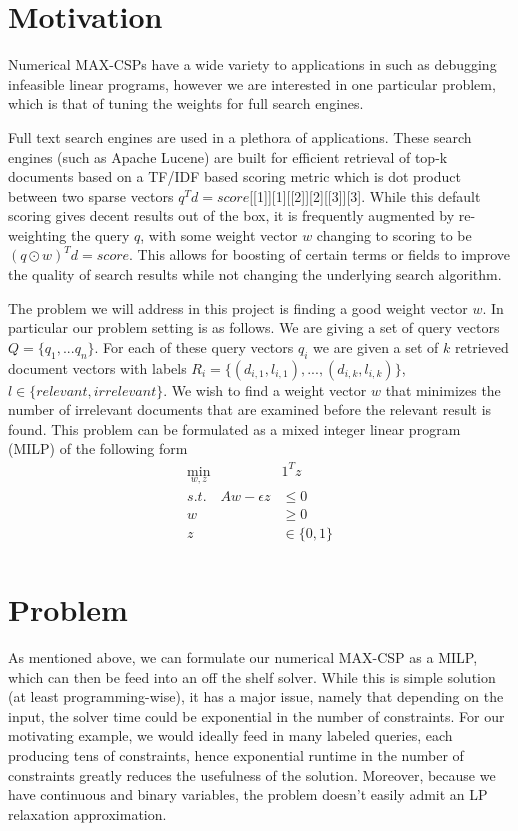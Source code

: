 \documentclass[a4paper]{article}
\begin{document}
\section{Motivation}

Numerical MAX-CSPs have a wide variety to applications in such as debugging infeasible 
linear programs, however we are interested in one particular problem, which is that of 
tuning the weights for full search engines. 

Full text search engines are used in a plethora of applications. These search engines (such as Apache Lucene)
are built for efficient retrieval of top-k documents based on a TF/IDF based scoring metric which is dot 
product between two sparse vectors $q^Td = score$[[1]][1][[2]][2][[3]][3]. While this default scoring gives decent results out of the box, 
it is frequently augmented by re-weighting the query $q$, with some weight vector $w$
changing to scoring to be $(q\odot w)^Td = score$. This allows for boosting of certain terms or fields
to improve the quality of search results while not changing the underlying search algorithm. 

The problem we will address in this project is finding a good weight vector $w$. In particular our
problem setting is as follows. We are giving a set of query vectors $Q = \{q_1, ... q_n\}$. For each 
of these query vectors $q_i$ we are given a set of $k$ retrieved document vectors with labels $R_i = \{(d_{i,1}, l_{i,1}), ..., (d_{i, k}, l_{i,k})\}$, 
$l \in \{relevant, irrelevant\}$.
We wish to find a weight vector $w$ that minimizes the number of irrelevant documents that are examined 
before the relevant result is found. This problem can be formulated as a mixed integer linear program (MILP)
of the following form
\begin{align*}
\min_{w,z}\quad &1^Tz\\
s.t. \quad Aw - \epsilon z &\leq 0\\
		w &\geq 0\\
		z &\in \{0,1\}\\
\end{align*}

\section{Problem}

As mentioned above, we can formulate our numerical MAX-CSP as a MILP, which can then be 
feed into an off the shelf solver. While this is simple solution (at least programming-wise), 
it has a major issue, namely that depending on the input, the solver time could be exponential in 
the number of constraints. For our motivating example, we would ideally feed in many labeled queries, 
each producing tens of constraints, hence exponential runtime in the number of constraints greatly 
reduces the usefulness of the solution. Moreover, because we have continuous and binary variables, 
the problem doesn't easily admit an LP relaxation approximation.
\end{document}
